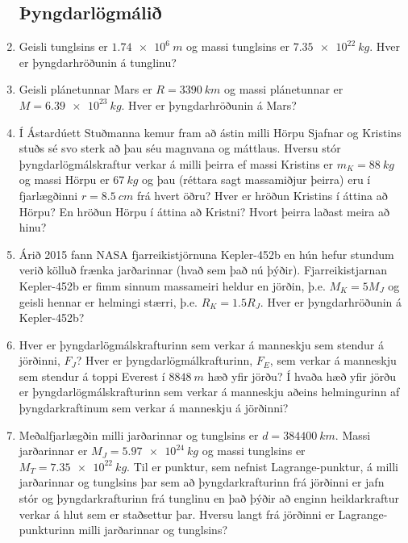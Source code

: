 \ifdefined \wholebook \else\documentclass[oneside]{book}\usepackage{EdlBook}\graphicspath{{figures/}}
\begin{document}
\begin{enumerate}[label = \textbf{Dæmi \thechapter.\arabic*.}]

\subsection*{Þyngdarlögmálið}

\item Geisli tunglsins er $\SI{1.74e6}{m}$ og massi tunglsins er $\SI{7.35e22}{kg}$. Hver er þyngdarhröðunin á tunglinu?

\item Geisli plánetunnar Mars er $R = \SI{3390}{km}$ og massi plánetunnar er $M = \SI{6.39e23}{kg}$. Hver er þyngdarhröðunin á Mars?

\item Í Ástardúett Stuðmanna kemur fram að ástin milli Hörpu Sjafnar og Kristins stuðs sé svo sterk að þau séu magnvana og máttlaus. Hversu stór þyngdarlögmálskraftur verkar á milli þeirra ef massi Kristins er $m_K = \SI{88}{kg}$ og massi Hörpu er $\SI{67}{kg}$ og þau (réttara sagt massamiðjur þeirra) eru í fjarlægðinni $r = \SI{8.5}{cm}$ frá hvert öðru? Hver er hröðun Kristins í áttina að Hörpu? En hröðun Hörpu í áttina að Kristni? Hvort þeirra laðast meira að hinu? 

\item Árið 2015 fann NASA fjarreikistjörnuna Kepler-452b en hún hefur stundum verið kölluð frænka jarðarinnar (hvað sem það nú þýðir). Fjarreikistjarnan Kepler-452b er fimm sinnum massameiri heldur en jörðin, þ.e. $M_K = 5M_J$ og geisli hennar er helmingi stærri, þ.e. $R_K = 1.5R_J$. Hver er þyngdarhröðunin á Kepler-452b?

\item Hver er þyngdarlögmálskrafturinn sem verkar á manneskju sem stendur á jörðinni, $F_J$? Hver er þyngdarlögmálkrafturinn, $F_E$, sem verkar á manneskju sem stendur á toppi Everest í $\SI{8848}{m}$ hæð yfir jörðu? Í hvaða hæð yfir jörðu er þyngdarlögmálskrafturinn sem verkar á manneskju aðeins helmingurinn af þyngdarkraftinum sem verkar á manneskju á jörðinni?

\item Meðalfjarlægðin milli jarðarinnar og tunglsins er $d = \SI{384400}{km}$. Massi jarðarinnar er $M_J = \SI{5.97e24}{kg}$ og massi tunglsins er $M_T = \SI{7.35e22}{kg}$. Til er punktur, sem nefnist Lagrange-punktur, á milli jarðarinnar og tunglsins þar sem að þyngdarkrafturinn frá jörðinni er jafn stór og þyngdarkrafturinn frá tunglinu en það þýðir að enginn heildarkraftur verkar á hlut sem er staðsettur þar. Hversu langt frá jörðinni er Lagrange-punkturinn milli jarðarinnar og tunglsins?


\end{enumerate}
\end{document}

